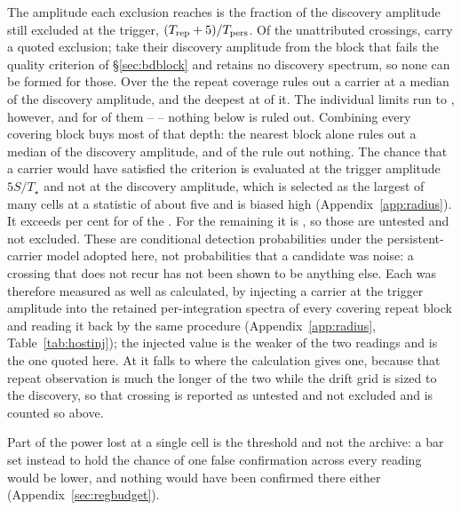 The amplitude each exclusion reaches is the fraction of the discovery
amplitude still excluded at the trigger, $(T_{\rm rep}+5)/T_{\rm pers}$. Of
the \RcNTested{} unattributed crossings, \RcNExcl{} carry a quoted exclusion;
\RcNWithheld{} take their discovery amplitude from the block that fails the
quality criterion of \S\ref{sec:bdblock} and \RcNNoSpec{} retains no discovery
spectrum, so none can be formed for those. Over the \RcNExcl{} the repeat coverage rules out a carrier at a median
\RcFracMed{} of the discovery amplitude, and the deepest at \RcFracMin{} of
it. The individual limits run to \RcFracMax, however, and for \RcNFracWeak{}
of them -- \RcFracWeakList{} -- nothing below \RcFracWeakLo{} is ruled out.
Combining every covering block buys most of that depth: the nearest block
alone rules out a median \TjFracNearMed{} of the discovery amplitude, and
\TjNNearWeak{} of the \RcNExcl{} rule out nothing. The chance that a carrier would have satisfied the criterion is evaluated at
the trigger amplitude $5S/T_\star$ and not at the discovery amplitude,
which is selected as the largest of many cells at a statistic of about five
and is biased high (Appendix~\ref{app:radius}). It exceeds
\RcPowerLevel{} per cent for \HjNPowerHi{} of the \RcNExcl. For the remaining
\HjNPowerLo{} it is \HjLowList, so those are untested and not excluded.
These are conditional detection probabilities under the persistent-carrier
model adopted here, not probabilities that a candidate was noise: a crossing
that does not recur has not been shown to be anything else. Each was
therefore measured as well as calculated, by injecting a carrier at the
trigger amplitude into the retained per-integration spectra of every covering
repeat block and reading it back by the same procedure
(Appendix~\ref{app:radius}, Table~\ref{tab:hostinj}); the injected value is
the weaker of the two readings and is the one quoted here. At \HjEtaStar{} it
falls to \HjEtaMeas{} where the calculation gives one, because that repeat
observation is much the longer of the two while the drift grid is sized to
the discovery, so that crossing is reported as untested and not excluded
and is counted so above.

Part of the power lost at a single cell is the threshold and not the archive:
a bar set instead to hold the chance of one false confirmation across every
reading would be lower, and nothing would have been confirmed
there either (Appendix~\ref{sec:regbudget}).

